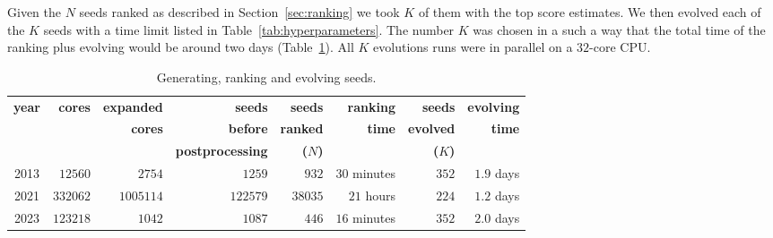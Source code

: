 Given the $N$ seeds ranked as described in Section~\ref{sec:ranking} we took $K$ of them with the top score estimates. We then evolved each of the $K$ seeds with a time limit listed in Table~\ref{tab:hyperparameters}. The number $K$ was chosen in a such a way that the total time of the ranking plus evolving would be around two days (Table~\ref{tab:rankingEvolving}). All $K$ evolutions runs were in parallel on a $32$-core CPU.

\begin{table}[htbp]
\caption{Generating, ranking and evolving seeds.}
\label{tab:rankingEvolving}
\centering
\begin{tabular}{c|r|r|r|r|r|r|r}
\toprule
{\bf year} & {\bf cores} & {\bf expanded} & {\bf seeds} & {\bf seeds} & {\bf ranking} & {\bf seeds} & {\bf evolving}\\
           & & {\bf cores} & {\bf before} & {\bf ranked} & {\bf time} & {\bf evolved} & {\bf time} \\
           & & & {\bf postprocessing} & {\bf ($N$)} & & {\bf ($K$)} & \\
\midrule
2013 & $12560$ & $2754$ & $1259$ & $932$ & $30$ minutes & $352$ & $1.9$ days \\ 
2021 & $332062$ & $1005114$ & $122579$ & $38035$ & $21$ hours & $224$ & $1.2$ days \\ 
2023 & $123218$ & $1042$ & $1087$ & $446$ & $16$ minutes & $352$ & $2.0$ days \\ 
\bottomrule
\end{tabular}
\end{table}

